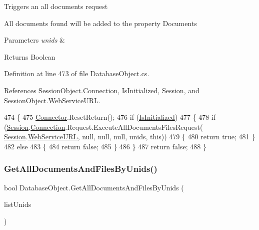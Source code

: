 Triggers an all documents request

All documents found will be added to the property \textquotesingle{}Documents\textquotesingle{}


\begin{DoxyParams}{Parameters}
{\em unids} & \\
\hline
\end{DoxyParams}
\begin{DoxyReturn}{Returns}
Boolean
\end{DoxyReturn}


Definition at line 473 of file Database\+Object.\+cs.



References Session\+Object.\+Connection, Is\+Initialized, Session, and Session\+Object.\+Web\+Service\+U\+RL.


\begin{DoxyCode}
474     \{
475         \mbox{\hyperlink{class_connector}{Connector}}.ResetReturn();
476         \textcolor{keywordflow}{if} (\mbox{\hyperlink{class_database_object_a5fe036d32a30eb10d1b3f6a30263f740}{IsInitialized}})
477         \{
478             \textcolor{keywordflow}{if} (\mbox{\hyperlink{class_database_object_aa8484162b7d2a7c4c9426bca13c64c07}{Session}}.\mbox{\hyperlink{class_session_object_a014bdbf705a753540e19bfb53030c55c}{Connection}}.Request.ExecuteAllDocumentsFilesRequest(
      \mbox{\hyperlink{class_database_object_aa8484162b7d2a7c4c9426bca13c64c07}{Session}}.\mbox{\hyperlink{class_session_object_a697c071c812fbf7ad1166b896fb44c16}{WebServiceURL}}, null, null, null, unids, \textcolor{keyword}{this}))
479             \{
480                 \textcolor{keywordflow}{return} \textcolor{keyword}{true};
481             \}
482             \textcolor{keywordflow}{else}
483             \{
484                 \textcolor{keywordflow}{return} \textcolor{keyword}{false};
485             \}
486         \}
487         \textcolor{keywordflow}{return} \textcolor{keyword}{false};
488     \}
\end{DoxyCode}
\mbox{\label{class_database_object_aa69262a50977a28a2decf400d1eedd20}} 
\subsubsection{\texorpdfstring{Get\+All\+Documents\+And\+Files\+By\+Unids()}{GetAllDocumentsAndFilesByUnids()}\hspace{0.1cm}{\footnotesize\ttfamily [2/2]}}
{\footnotesize\ttfamily bool Database\+Object.\+Get\+All\+Documents\+And\+Files\+By\+Unids (\begin{DoxyParamCaption}\item[{I\+List}]{list\+Unids }\end{DoxyParamCaption})}



